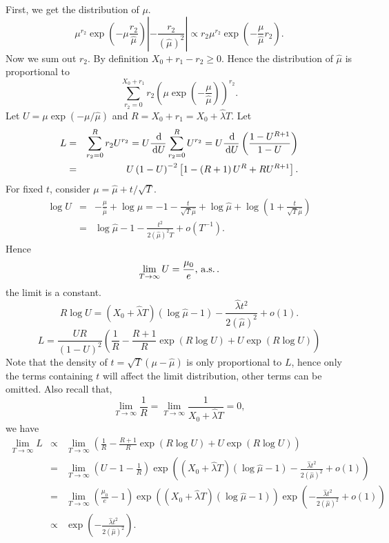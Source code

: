 First, we get the distribution of $\mu$. 
\[
\mu^{r_{2}}\exp\left(-\mu\frac{r_{2}}{\hat{\mu}}\right)\left|-\frac{r_{2}}{\left(\hat{\mu}\right)^{2}}\right|\propto r_{2}\mu^{r_{2}}\exp\left(-\frac{\mu}{\hat{\mu}}r_{2}\right).
\]
Now we sum out $r_{2}$. By definition $X_{0}+r_{1}-r_{2}\ge0$. Hence
the distribution of $\hat{\mu}$ is proportional to 
\[
\sum_{r_{2}=0}^{X_{0}+r_{1}}r_{2}\left(\mu\exp\left(-\frac{\mu}{\hat{\mu}}\right)\right)^{r_{2}}.
\]
Let $U=\mu\exp\left(-\mu/\hat{\mu}\right)$ and $R=X_{0}+r_{1}=X_{0}+\hat{\lambda}T$.
Let 
\begin{eqnarray*}
L & = & \sum_{r_{2}=0}^{R}r_{2}U^{r_{2}}=U\frac{\,\mathrm{d}}{\,\mathrm{d} U}\sum_{r_{2}=0}^{R}U^{r_{2}}=U\frac{\,\mathrm{d}}{\,\mathrm{d} U}\left(\frac{1-U^{R+1}}{1-U}\right)\\
 & = & U\left(1-U\right)^{-2}\left[1-\left(R+1\right)U^{R}+RU^{R+1}\right].
\end{eqnarray*}
For fixed $t$, consider $\mu=\hat{\mu}+t/\sqrt{T}$. 
\begin{eqnarray*}
\log U & = & -\frac{\mu}{\hat{\mu}}+\log\mu=-1-\frac{t}{\sqrt{T}\hat{\mu}}+\log\hat{\mu}+\log\left(1+\frac{t}{\sqrt{T}\hat{\mu}}\right)\\
 & = & \log\hat{\mu}-1-\frac{t^{2}}{2\left(\hat{\mu}\right)^{2}T}+o\left(T^{-1}\right).
\end{eqnarray*}
 {Hence 
\[
\lim_{T\rightarrow\infty}U=\frac{\mu_{0}}{e},\,\mathrm{a.s.}\,.
\]
the limit is a constant. 
\[
R\log U=\left(X_{0}+\hat{\lambda}T\right)\left(\log\hat{\mu}-1\right)-\frac{\hat{\lambda}t^{2}}{2\left(\hat{\mu}\right)^{2}}+o\left(1\right).
\]
\[
L=\frac{UR}{\left(1-U\right)^{2}}\left(\frac{1}{R}-\frac{R+1}{R}\exp\left(R\log U\right)+U\exp\left(R\log U\right)\right)
\]
Note that the density of $t=\sqrt{T}\left(\mu-\hat{\mu}\right)$ is
only proportional to $L$, hence only the terms containing $t$ will
affect the limit distribution, other terms can be omitted. Also recall
that, 
\[
\lim_{T\rightarrow\infty}\frac{1}{R}=\lim_{T\rightarrow\infty}\frac{1}{X_{0}+\hat{\lambda}T}=0,
\]
we have 
\begin{eqnarray*}
\lim_{T\rightarrow\infty}L & \propto & \lim_{T\rightarrow\infty}\left(\frac{1}{R}-\frac{R+1}{R}\exp\left(R\log U\right)+U\exp\left(R\log U\right)\right)\\
 & = & \lim_{T\rightarrow\infty}\left(U-1-\frac{1}{R}\right)\exp\left(\left(X_{0}+\hat{\lambda}T\right)\left(\log\hat{\mu}-1\right)-\frac{\hat{\lambda}t^{2}}{2\left(\hat{\mu}\right)^{2}}+o\left(1\right)\right)\\
 & = & \lim_{T\rightarrow\infty}\left(\frac{\mu_{0}}{e}-1\right)\exp\left(\left(X_{0}+\hat{\lambda}T\right)\left(\log\hat{\mu}-1\right)\right)\exp\left(-\frac{\hat{\lambda}t^{2}}{2\left(\hat{\mu}\right)^{2}}+o\left(1\right)\right)\\
 & \propto & \exp\left(-\frac{\hat{\lambda}t^{2}}{2\left(\hat{\mu}\right)^{2}}\right).
\end{eqnarray*}
}


